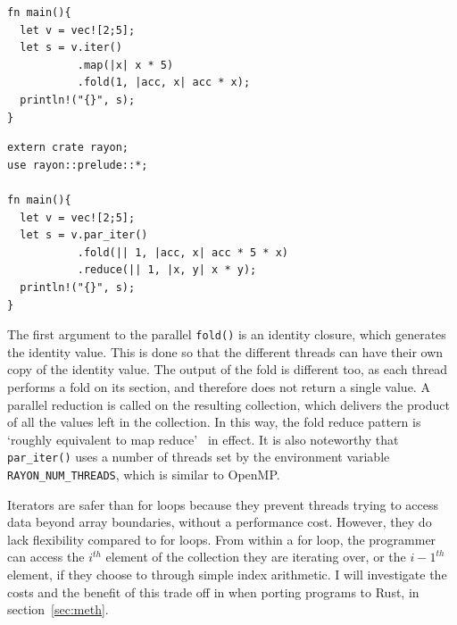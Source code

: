\noindent\begin{minipage}{.49\textwidth}
\begin{code}
\begin{verbatim}
fn main(){
  let v = vec![2;5];
  let s = v.iter()
           .map(|x| x * 5)
           .fold(1, |acc, x| acc * x);
  println!("{}", s);
}
\end{verbatim}
\label{lst:rust-seq-iter}
\end{code}
\end{minipage}\hfill
\begin{minipage}{.49\textwidth}
\begin{code}
\begin{verbatim}
extern crate rayon;
use rayon::prelude::*;

fn main(){
  let v = vec![2;5];
  let s = v.par_iter()
           .fold(|| 1, |acc, x| acc * 5 * x)
           .reduce(|| 1, |x, y| x * y);
  println!("{}", s);
}
\end{verbatim}
\label{lst:rust-par-iter}
\label{lst:iters-a}
\end{code}
\end{minipage}

The first argument to the parallel \texttt{fold()} is an identity closure, which generates the identity value. This is done so that the different threads can have their own copy of the identity value. The output of the fold is different too, as each thread performs a fold on its section, and therefore does not return a single value. A parallel reduction is called on the resulting collection, which delivers the product of all the values left in the collection.
In this way, the fold reduce pattern is `roughly equivalent to map reduce'~\cite{rayonIter} in effect. It is also noteworthy that \texttt{par\_iter()} uses a number of threads set by the environment variable \texttt{RAYON\_NUM\_THREADS}, which is similar to OpenMP\@.

Iterators are safer than for loops because they prevent threads trying to access data beyond array boundaries, without a performance cost. However, they do lack flexibility compared to for loops. From within a for loop, the programmer can access the $i^{th}$ element of the collection they are iterating over, or the $i-1^{th}$ element, if they choose to through simple index arithmetic. I will investigate the costs and the benefit of this trade off in when porting programs to Rust, in section~\ref{sec:meth}.

